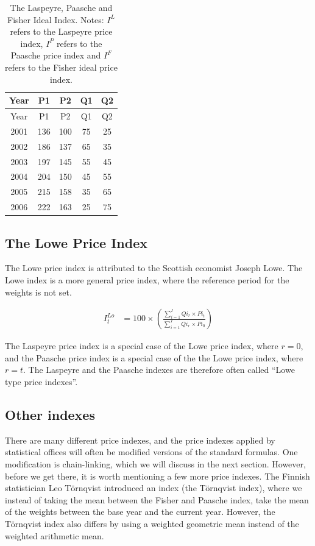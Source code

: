 \documentclass[]{book}
\begin{document}
\begin{longtable}[]{@{}ccccc@{}}
\caption{\label{tab:price5} The Laspeyre, Paasche and Fisher Ideal Index. Notes: \(I^L\) refers to the Laspeyre price index, \(I^P\) refers to the Paasche price index and \(I^F\) refers to the Fisher ideal price index.}\tabularnewline
\toprule
Year & P1 & P2 & Q1 & Q2\tabularnewline
\midrule
\endfirsthead
\toprule
Year & P1 & P2 & Q1 & Q2\tabularnewline
\midrule
\endhead
2001 & 136 & 100 & 75 & 25\tabularnewline
2002 & 186 & 137 & 65 & 35\tabularnewline
2003 & 197 & 145 & 55 & 45\tabularnewline
2004 & 204 & 150 & 45 & 55\tabularnewline
2005 & 215 & 158 & 35 & 65\tabularnewline
2006 & 222 & 163 & 25 & 75\tabularnewline
\bottomrule
\end{longtable}

\hypertarget{the-lowe-price-index}{%
\subsection{The Lowe Price Index}\label{the-lowe-price-index}}

The Lowe price index is attributed to the Scottish economist Joseph Lowe. The Lowe index is a more general price index, where the reference period for the weights is not set.

\begin{align}
   I_t^{Lo}&=100\times \left(\frac{\sum^I_{i=1} Qi_r \times Pi_t}{\sum^I_{i=1}Qi_r \times Pi_0}\right)
    \label{eq12}
\end{align}

The Laspeyre price index is a special case of the Lowe price index, where \(r=0\), and the Paasche price index is a special case of the the Lowe price index, where \(r=t\). The Laspeyre and the Paasche indexes are therefore often called ``Lowe type price indexes''.

\hypertarget{other-indexes}{%
\subsection{Other indexes}\label{other-indexes}}

There are many different price indexes, and the price indexes applied by statistical offices will often be modified versions of the standard formulas. One modification is chain-linking, which we will discuss in the next section. However, before we get there, it is worth mentioning a few more price indexes. The Finnish statistician Leo Törnqvist introduced an index (the Törnqvist index), where we instead of taking the mean between the Fisher and Paasche index, take the mean of the weights between the base year and the current year. However, the Törnqvist index also differs by using a weighted geometric mean instead of the weighted arithmetic mean.
\end{document}
